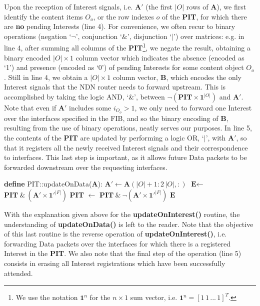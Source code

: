 Upon the reception of Interest signals, i.e. $\textbf{A}'$ (the first $|O|$ rows 
of $\textbf{A}$), we first identify the content items $O_o$, or the row indexes $o$ of the 
\textbf{PIT}, for which there are \textbf{no} pending Interests (line 4). For 
convenience, we often recur to binary operations (negation `$\neg$', 
conjunction `$\&$', disjunction `$|$') over matrices: e.g. in line 4, after 
summing all columns of the \textbf{PIT}\footnote{We use the notation $\textbf{1}^{n}$ for the $n \times 1$
sum vector, i.e. $\textbf{1}^{n} = [1\,1\,...\,1]^{T}$.}, we negate the 
result, obtaining a binary encoded $|O| \times 1$ 
column vector which indicates the absence (encoded as  `1') and presence 
(encoded as `0') of pending Interests for some content object $O_o$. Still in 
line 4, we obtain a $|O| \times 1$ column vector, $\textbf{B}$, which encodes the 
only Interest signals that the NDN router needs to forward upstream. This is 
accomplished by taking the logic AND, `$\&$', between $\neg(\textbf{PIT} \times \textbf{1}^{|O|})$ and 
$\textbf{A}'$. Note that even 
if $\textbf{A}'$ includes some $i_{O_o} > 1$, we only need to forward one Interest 
over the interfaces specified in the FIB, and so the binary encoding of $\textbf{B}$, 
resulting from the use of binary operations, neatly serves our purposes. 
In line 5, the 
contents of the \textbf{PIT} are updated by performing a logic OR, `$|$', with $\textbf{A}'$, so 
that it registers all the newly received 
Interest signals and their correspondence to interfaces. This last step is important, 
as it allows future Data packets to be forwarded downstream over the requesting 
interfaces.\shortvertbreak

\begin{algorithmic}[1]

\State \textbf{define} PIT::updateOnData($\textbf{A}$):
\State
    \State $\textbf{A}' \leftarrow \textbf{A}(|O|+1:2\,|O|,:)$
    \State $\textbf{E} \leftarrow$ $\textbf{PIT} \ \& \ (\textbf{A}' \times \textbf{1}'^{|F|})$
    \State \textbf{PIT} $\leftarrow$ $\textbf{PIT} \ \& \ \neg(\textbf{A}' \times \textbf{1}'^{|F|})$ 
    \State \Return $\textbf{E}$

\end{algorithmic}\shortvertbreak

With the explanation given above for the \textbf{updateOnInterest()} routine, 
the understanding of \textbf{updateOnData()} is left to the reader. Note that 
the objective of this last routine is the reverse operation of \textbf{updateOnInterest()}, i.e. forwarding Data 
packets over the interfaces for which there is a registered Interest in the \textbf{PIT}. We 
also note that the final step of the operation (line 5) consists in erasing 
all Interest registrations which have been successfully attended.\shortvertbreak

